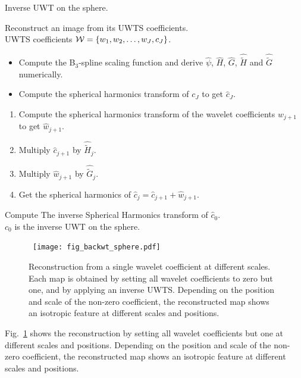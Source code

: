 {\linespread{1}
\begin{algorithm}[h]
\caption{Inverse UWT on the sphere.}
\label{algo_iuwts}
 Reconstruct an image from its UWTS coefficients.\\
 UWTS coefficients ${\cal W}=\{w_1, w_2, \dots, w_{J}, c_{J}\}$.\\
\begin{itemize}
\item Compute the B$_3$-spline scaling function and derive $\hat{\psi}$, $\widehat{H}$, $\widehat{G}$, $\widehat{\tilde H}$ and $\widehat{\tilde G}$ numerically.
\item Compute the spherical harmonics transform of $c_J$ to get ${\hat c}_J$.
\end{itemize}
 {
\begin{enumerate}[1.]
\item Compute the spherical harmonics transform of the wavelet coefficients $w_{j+1}$ to get $\hat{w}_{j+1}$.
\item Multiply $\hat{c}_{j+1}$ by ${\widehat {\tilde H}}_{j}$.
\item Multiply $\hat{w}_{j+1}$ by ${\widehat {\tilde G}}_{j}$.
\item Get the spherical harmonics of $\hat{c}_j=\hat{c}_{j+1}+\hat{w}_{j+1}$.
\end{enumerate}
}
Compute The inverse Spherical Harmonics transform of $\hat c_0$.\\
 $c_0$ is the inverse UWT on the sphere.
\end{algorithm}

\begin{figure}[htb]
\centerline{
\hbox{
\texttt{[image: fig\_backwt\_sphere.pdf]}
}}
\caption{Reconstruction from a single wavelet coefficient at different scales. Each map is obtained by setting all wavelet coefficients to zero but one, and by applying an inverse UWTS. Depending on the position and scale of the non-zero coefficient, the reconstructed map shows an isotropic feature 
at different scales and positions.}
\label{Figure:back_wt}
\end{figure}
}
Fig.~\ref{Figure:back_wt} shows the reconstruction by setting all wavelet coefficients but one at different scales
and positions. Depending on the position and scale of the non-zero coefficient, the reconstructed map shows an isotropic feature 
at different scales and positions.
 

